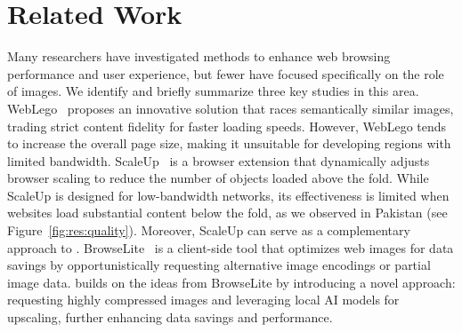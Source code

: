 \section{Related Work}
\label{sec:related}
Many researchers have investigated methods to enhance web browsing performance and user experience, but fewer have focused specifically on the role of images. We identify and briefly summarize three key studies in this area. WebLego~\cite{webLego} proposes an innovative solution that races semantically similar images, trading strict content fidelity for faster loading speeds. However, WebLego tends to increase the overall page size, making it unsuitable for developing regions with limited bandwidth. ScaleUp~\cite{newman2019scaling} is a browser extension that dynamically adjusts browser scaling to reduce the number of objects loaded above the fold. While ScaleUp is designed for low-bandwidth networks, its effectiveness is limited when websites load substantial content below the fold, as we observed in Pakistan (see Figure~\ref{fig:res:quality}). Moreover, ScaleUp can serve as a complementary approach to \tool. BrowseLite~\cite{browseLite} is a client-side tool that optimizes web images for data savings by opportunistically requesting alternative image encodings or partial image data. \tool builds on the ideas from BrowseLite by introducing a novel approach: requesting highly compressed images and leveraging local AI models for upscaling, further enhancing data savings and performance.